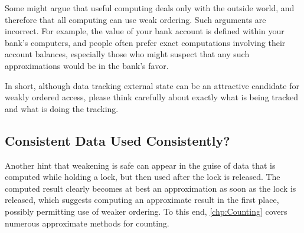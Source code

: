 \QuickQuizEnd

Some might argue that useful computing deals only with the outside world,
and therefore that all computing can use weak ordering.
Such arguments are incorrect.
For example, the value of your bank account is defined within your
bank's computers, and people often prefer exact computations involving
their account balances, especially those who might suspect that any such
approximations would be in the bank's favor.

In short, although data tracking external state can be an attractive
candidate for weakly ordered access, please think carefully about
exactly what is being tracked and what is doing the tracking.

\subsection{Consistent Data Used Consistently?}
\label{sec:app:questions:Consistent Data Used Consistently?}

Another hint that weakening is safe can appear in the guise of data
that is computed while holding a lock, but then used after the lock
is released.
The computed result clearly becomes at best an approximation as soon as
the lock is released, which suggests computing an approximate result
in the first place, possibly permitting use of weaker ordering.
To this end, \cref{chp:Counting} covers numerous approximate methods
for counting.

